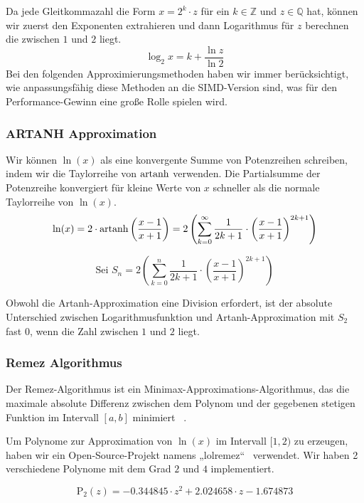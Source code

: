 Da jede Gleitkommazahl die Form $x = 2^{k} \cdot z$ für ein $k \in \mathbb{Z}$ und $ z \in \mathbb{Q}$ hat, können wir zuerst den Exponenten extrahieren und dann Logarithmus für $z$ berechnen die zwischen $1$ und $2$ liegt.
\[\log_2{x} = k + \frac{\ln{z}}{\ln{2}}\]
Bei den folgenden Approximierungsmethoden haben wir immer berücksichtigt, wie anpassungsfähig diese Methoden an die SIMD-Version sind, was für den Performance-Gewinn eine große Rolle spielen wird.

\subsubsection{ARTANH Approximation}
Wir können $\ln(x)$ als eine  konvergente Summe von Potenzreihen schreiben, indem wir die Taylorreihe von $\operatorname{artanh}$ verwenden. Die Partialsumme der Potenzreihe konvergiert für kleine Werte von $x$ schneller als die normale Taylorreihe von $\ln(x)$.
\begin{equation}
    \ln(x) = 2 \cdot \operatorname{artanh}\left(\frac{x-1}{x+1}\right) = 2\left(\sum _{k=0}^{\infty}{\frac{1}{2k+1} \cdot \left(\frac{x-1}{x+1}\right)^{2k+1}}\right)
\end{equation}

\begin{equation}
   \text{Sei }  S_{n} = 2\left(\sum _{k=0}^{n}{\frac{1}{2k+1} \cdot \left(\frac{x-1}{x+1}\right)^{2k+1}}\right)
   \label{eq:artanh}
\end{equation}

Obwohl die Artanh-Approximation eine Division erfordert, ist der absolute Unterschied zwischen Logarithmusfunktion und Artanh-Approximation mit $S_{2}$ fast $0$, wenn die Zahl zwischen $1$ und $2$ liegt.

\subsubsection{Remez Algorithmus}
Der Remez-Algorithmus ist ein Minimax-Approximations-Algorithmus, das die maximale absolute Differenz zwischen dem Polynom und der gegebenen stetigen Funktion im Intervall $[a,b]$ minimiert ~\cite{remez}.

Um Polynome zur Approximation von $\ln(x)$ im Intervall $[1,2)$ zu erzeugen, haben wir ein Open-Source-Projekt namens „lolremez“~\cite{lolremez} verwendet.
Wir haben 2 verschiedene Polynome mit dem Grad $2$ und $4$ implementiert.

\begin{equation}
    \mathrm{P_{2}}(z) = -0.344845 \cdot z^{2}+ 2.024658 \cdot z -1.674873
    \label{eq:deg2}
\end{equation}

